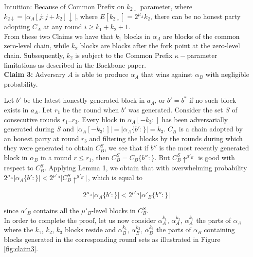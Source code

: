 Intuition: Because of Common Prefix on $k_{2\downarrow}$ parameter, where
$k_{2\downarrow} = \vert \alpha_A[j:j+k_2]\downarrow\vert$, where
$E[k_{2\downarrow}] = 2^{\mu_A}k_2$, there can be no honest party adopting
$C_A$ at any round $i \geq k_1 + k_2 + 1$. \\

From these two Claims we have that $k_1$ blocks in $\alpha_A$ are blocks of the
common zero-level chain, while $k_2$ blocks are blocks after the fork point at
the zero-level chain. Subsequently, $k_2$ is subject to the Common Prefix
$\kappa-$parameter limitations as described in the Backbone paper\cite{Backbone}.\\

\textbf{Claim 3:} Adversary $A$ is able to produce $\alpha_A$ that wins against
$\alpha_B$ with negligible probability.

Let $b'$ be the latest honestly generated block in $a_A$, or $b' = b^*$ if no
such block exists in $a_A$. Let $r_1$ be the round when $b'$ was generated.
Consider the set $S$ of consecutive rounds $r_1..r_3$. Every block in
$\alpha_A[-k_3:]$ has been adversarially generated during $S$ and $\vert
\alpha_A[-k_3:] \vert = \vert \alpha_A\{b':\} \vert = k_3$. $C_B$ is a chain
adopted by an honest party at round $r_3$ and filtering the blocks by the rounds
during which they were generated to obtain $C_B^S$, we see that if $b''$ is the
most recently generated block in $\alpha_B$ in a round $r \leq r_1$, then $C_B^S =
C_B\{ b'': \}$. But $C_B^S \uparrow^{\mu'_B}$ is good with respect to $C_B^S$.
Applying Lemma 1, we obtain that with overwhelming probability  $2^{\mu_A} \vert
\alpha_A\{b':\} \vert < 2^{\mu'_B} \vert C_B^S \uparrow^{\mu'_B} \vert$, which is
equal to

\begin{equation}
2^{\mu_A} \vert \alpha_A\{b':\} \vert < 2^{\mu'_B} \vert \alpha'_B\{b'':\} \vert
\end{equation} 

since $\alpha'_B$ contains all the $\mu'_B$-level blocks in $C_B^S$. \\


In order to complete the proof, let us now consider $\alpha_A^{k_1}$,
$\alpha_A^{k_2}$, $\alpha_A^{k_3}$ the parts of $\alpha_A$ where the
$k_1$, $k_2$, $k_3$ blocks reside and $\alpha_B^{k_1}$, $\alpha_B^{k_2}$,
$\alpha_B^{k_3}$ the parts of $\alpha_B$ containing blocks generated in the
corresponding round sets as illustrated in Figure \ref{fig:claim3}.

